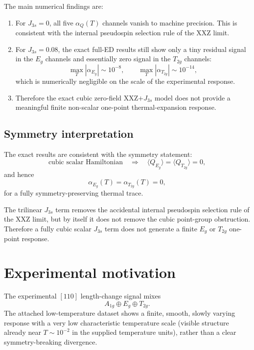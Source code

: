 \documentclass[11pt]{article}
\begin{document}
The main numerical findings are:
\begin{enumerate}[leftmargin=1.8em]
\item For $J_{3s}=0$, all five $\alpha_Q(T)$ channels vanish to machine
precision. This is consistent with the internal pseudospin selection rule
of the XXZ limit.
\item For $J_{3s}=0.08$, the exact full-ED results still show only a tiny
residual signal in the $E_g$ channels and essentially zero signal in the
$T_{2g}$ channels:
\begin{equation}
\max_T |\alpha_{E_g}| \sim 10^{-8},
\qquad
\max_T |\alpha_{T_{2g}}| \sim 10^{-14},
\end{equation}
which is numerically negligible on the scale of the experimental response.
\item Therefore the exact cubic zero-field XXZ$+J_{3s}$ model does not provide
a meaningful finite non-scalar one-point thermal-expansion response.
\end{enumerate}

\subsection{Symmetry interpretation}

The exact results are consistent with the symmetry statement:
\begin{equation}
\text{cubic scalar Hamiltonian}
\quad \Longrightarrow \quad
\langle Q_{E_g}\rangle = \langle Q_{T_{2g}}\rangle = 0,
\end{equation}
and hence
\begin{equation}
\alpha_{E_g}(T)=\alpha_{T_{2g}}(T)=0,
\end{equation}
for a fully symmetry-preserving thermal trace.

The trilinear $J_{3s}$ term removes the accidental internal pseudospin
selection rule of the XXZ limit, but by itself it does not remove the cubic
point-group obstruction. Therefore a fully cubic scalar $J_{3s}$ term does not
generate a finite $E_g$ or $T_{2g}$ one-point response.

\section{Experimental motivation}

The experimental $[110]$ length-change signal mixes
\begin{equation}
A_{1g}\oplus E_g \oplus T_{2g}.
\end{equation}
The attached low-temperature dataset shows a finite, smooth, slowly varying
response with a very low characteristic temperature scale (visible structure
already near $T \sim 10^{-2}$ in the supplied temperature units), rather than a
clear symmetry-breaking divergence.
\end{document}
